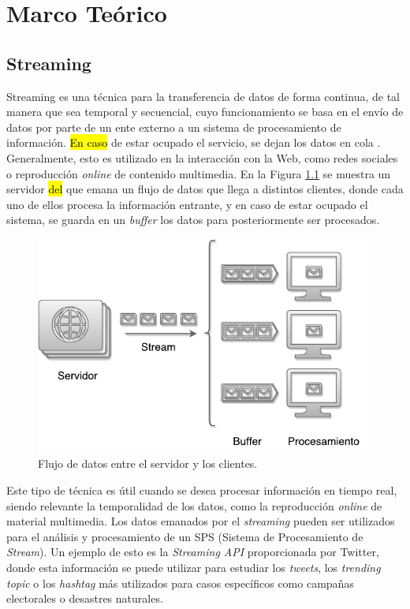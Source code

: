 \chapter{Marco Teórico}
\label{cap:marcoTeorico}

\section{Streaming}
\label{sec:streaming}

Streaming es una técnica para la transferencia de datos de forma continua, de tal manera que sea temporal y secuencial, cuyo funcionamiento se basa en el envío de datos por parte de un ente externo a un sistema de procesamiento de información. \hl{En caso} de estar ocupado el servicio, se dejan los datos en cola \citep{Menin2002SMH}. Generalmente, esto es utilizado en la interacción con la Web, como redes sociales o reproducción \textit{online} de contenido multimedia. En la Figura \ref{fig:streaming} se muestra un servidor \hl{del} que emana un flujo de datos que llega a distintos clientes, donde cada uno de ellos procesa la información entrante, y en caso de estar ocupado el sistema, se guarda en un \textit{buffer} los datos para posteriormente ser procesados.

\begin{figure}[ht!]
  \centering
    \includegraphics[scale=0.7]{images/Streaming.pdf}
  \caption{Flujo de datos entre el servidor y los clientes.}
  \label{fig:streaming}
\end{figure}

Este tipo de técnica es útil cuando se desea procesar información en tiempo real, siendo relevante la temporalidad de los datos, como la reproducción \textit{online} de material multimedia. Los datos emanados por el \textit{streaming} pueden ser utilizados para el análisis y procesamiento de un SPS (Sistema de Procesamiento de \textit{Stream}). Un ejemplo de esto es la \textit{Streaming API} proporcionada por Twitter, donde esta información se puede utilizar para estudiar los \textit{tweets}, los \textit{trending topic} o los \textit{hashtag} más utilizados para casos específicos como campañas electorales o desastres naturales.

